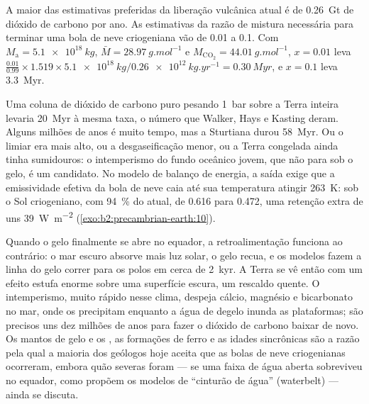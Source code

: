 \begin{example}\label{ex:b2:precambrian-earth:escape}
A maior das estimativas preferidas da liberação vulcânica atual é de \qty{0.26}{Gt} de dióxido
de carbono por ano. As estimativas da
razão de mistura necessária para terminar uma bola de neve criogeniana vão de 0.01 a 0.1. Com $M_{\text{a}} =
\qty{5.1e18}{kg}$, $\bar M = \qty{28.97}{g.mol^{-1}}$ e $M_{\mathrm{CO_2}} =
\qty{44.01}{g.mol^{-1}}$, $x = 0.01$ leva $\frac{0.01}{0.99}\times1.519\times\qty{5.1e18}{kg}
/ \qty{0.26e12}{kg.yr^{-1}} = \qty{0.30}{Myr}$, e $x = 0.1$ leva \qty{3.3}{Myr}.
\end{example}

Uma coluna de dióxido de carbono puro pesando \qty{1}{bar} sobre a Terra inteira levaria
\qty{20}{Myr} à mesma taxa, o número que Walker, Hays e Kasting deram. Alguns milhões de anos
é muito tempo, mas a Sturtiana durou \qty{58}{Myr}. Ou o limiar era mais alto, ou a
desgaseificação menor, ou a Terra congelada ainda tinha sumidouros: o intemperismo do fundo oceânico jovem,
que não para sob o gelo, é um candidato. No modelo de balanço de energia, a saída exige
que a emissividade efetiva da bola de neve caia até sua temperatura atingir \qty{263}{K}: sob
o Sol criogeniano, com \qty{94}{\percent} do atual, de 0.616 para 0.472, uma retenção extra de
uns \qty{39}{W.m^{-2}} (\cref{exo:b2:precambrian-earth:10}).

Quando o gelo finalmente se abre no equador, a retroalimentação funciona ao contrário: o mar escuro absorve mais
luz solar, o gelo recua, e os modelos fazem a linha do gelo correr para os polos em cerca de
\qty{2}{kyr}. A Terra se vê então com um efeito estufa enorme sobre uma superfície escura, um
rescaldo quente. O intemperismo, muito rápido nesse clima, despeja cálcio, magnésio e bicarbonato no
mar, onde os  precipitam enquanto a água de degelo inunda as plataformas; são precisos
uns dez milhões de anos para fazer o dióxido de carbono baixar de novo. Os mantos de gelo e os , as formações de ferro e as idades sincrônicas são a razão pela qual a maioria dos geólogos hoje aceita
que as bolas de neve criogenianas ocorreram, embora quão severas foram --- se uma faixa de água
aberta sobreviveu no equador, como propõem os modelos de ``cinturão de água'' (waterbelt) --- ainda se discuta.

